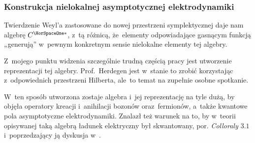 \documentclass[10pt,t]{beamer}
\begin{document}
\begin{frame}
  \frametitle{Konstrukcja nielokalnej asymptotycznej
    elektrodynamiki}


  Twierdzenie Weyl’a zastosowane do nowej przestrzeni symplektycznej daje
  nam algebrę $C^{ \HorSpaceOne * }$, z~tą różnicą, że~elementy
  odpowiadające gasnącym funkcją „generują” w~pewnym konkretnym sensie
  \alert{nielokalne} elementy tej algebry.

  Z~mojego punktu widzenia szczególnie trudną częścią pracy jest utworzenie
  reprezentacji tej algebry. Prof.~Herdegen jest w~stanie to zrobić
  korzystając z~odpowiednich
  przestrzeni Hilberta, ale~to temat na zupełnie osobne spotkanie.

  W~ten sposób utworzona zostaje algebra i~jej reprezentację
  na tyle dużą, by objęła operatory kreacji i~anihilacji bozonów
  oraz~fermionów, a~także kwantowe pola asymptotyczne elektrodynamiki.
  Znalazł też warunek na to, by w~teorii opisywanej taką algebrą ładunek
  elektryczny był skwantowany, por. \textit{Colloraly $3.1$}
  i~poprzedzający ją dyskusja
  w~\parencite{Herdegen-Semidirect-product-of-CCR-and-CAR-algebras-ETC-Pub-1998}.


\end{frame}
\end{document}
